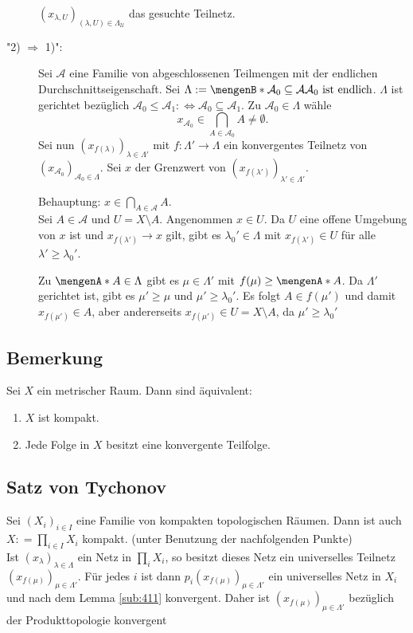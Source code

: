 \begin{description}
	$(x_{\lambda , U})_{(\lambda ,U) \in \Lambda_\mathcal{U} }$ das gesuchte Teilnetz.
	\item["2) $\Rightarrow $ 1)":] Sei $\mathcal{A}$ eine Familie von abgeschlossenen Teilmengen mit der endlichen Durchschnittseigenschaft. Sei 
	$\Lambda := \set[\mathcal{A}_0 \subseteq \mathcal{A}  ]{\mathcal{A}_0 \text{ ist endlich} } $. $\Lambda$ ist gerichtet bezüglich 
	$\mathcal{A}_0 \le \mathcal{A}_1  :\Leftrightarrow \mathcal{A}_0 \subseteq \mathcal{A}_1 $. Zu $\mathcal{A}_0 \in \Lambda $ wähle 
	\[
		x_{\mathcal{A}_0 } \in \bigcap_{A \in \mathcal{A}_0 } A \not= \emptyset.
	\]
	Sei nun $(x_{f(\lambda )})_{\lambda  \in \Lambda'}$ mit $f : \Lambda' \to \Lambda$ ein konvergentes Teilnetz von $(x_{\mathcal{A}_0 })_{\mathcal{A}_0 \in \Lambda}$.
	Sei $x$ der Grenzwert von $(x_{f(\lambda')})_{\lambda'  \in \Lambda'}$. 
	
	Behauptung: $x \in \bigcap_{A \in \mathcal{A} } A$. \\
	Sei $A \in \mathcal{A}$ und $U = X \setminus A$. Angenommen $x \in U$. Da $U$ eine offene Umgebung von $x$ ist und $x_{f(\lambda')} \to x$ gilt, gibt es 
	$\lambda_0' \in \Lambda$ mit $x_{f(\lambda')} \in U$ für alle $\lambda' \ge \lambda_0'$. 
	
	Zu $\set{A} \in \Lambda$ gibt es $\mu \in \Lambda'$ mit $f(\mu) \ge \set{A}$. Da $\Lambda '$ gerichtet ist, gibt es $\mu' \ge \mu$ und $\mu' \ge \lambda_0'$. Es folgt 
	$A \in f(\mu')$ und damit $x_{f(\mu')} \in A$, aber andererseits $x_{f(\mu')} \in U  = X \setminus A$, da $\mu' \ge \lambda_0'$ \light \bewende
\end{description}

\subsection[Bemerkung zu Kompaktheit in metrischen Räumen]{Bemerkung} %
\label{sub:46}
Sei $X$ ein metrischer Raum. Dann sind äquivalent:
	\begin{enumerate}[(1)]
		\item $X$ ist kompakt.
		\item Jede Folge in $X$ besitzt eine konvergente Teilfolge.
	\end{enumerate}

\subsection{Satz von Tychonov} %
\label{sub:47}
Sei $(X_i)_{i \in I}$ eine Familie von kompakten topologischen Räumen. Dann ist auch $X : = \prod_{i \in I} X_i$ kompakt.
(unter Benutzung der nachfolgenden Punkte)\\
Ist $(x_\lambda )_{\lambda  \in \Lambda}$ ein Netz in $\prod_i X_i$, so besitzt dieses Netz ein universelles Teilnetz $(x_{f(\mu)})_{\mu \in \Lambda'}$.
Für jedes $i$ ist dann $p_i(x_{f(\mu)})_{\mu \in \Lambda'}$ ein universelles Netz in $X_i$ und nach dem Lemma \ref{sub:411} konvergent.
Daher ist $(x_{f(\mu)})_{\mu \in \Lambda'}$ bezüglich der Produkttopologie konvergent



